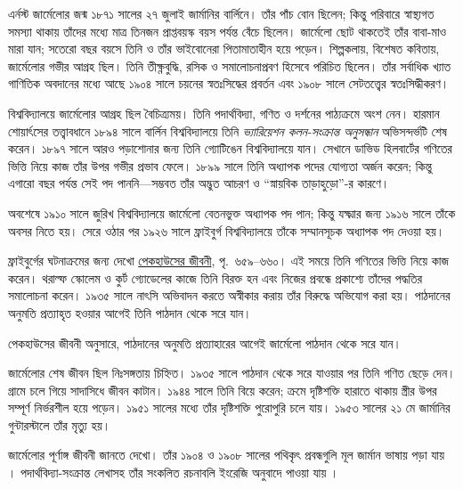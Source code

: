 \documentclass[../../../include/open-logic-section]{subfiles}
\begin{document}



এর্নস্ট জার্মেলোর জন্ম ১৮৭১ সালের ২৭ জুলাই
জার্মানির বার্লিনে। তাঁর পাঁচ বোন ছিলেন;
কিন্তু পরিবারে স্বাস্থ্যগত সমস্যা থাকায়
তাঁদের মধ্যে মাত্র তিনজন প্রাপ্তবয়স্ক
বয়স পর্যন্ত বেঁচে ছিলেন। জার্মেলো ছোট
থাকতেই তাঁর বাবা-মাও মারা যান; সতেরো
বছর বয়সে তিনি ও তাঁর ভাইবোনেরা
পিতামাতাহীন হয়ে পড়েন। শিল্পকলায়,
বিশেষত কবিতায়, জার্মেলোর গভীর আগ্রহ
ছিল। তিনি তীক্ষ্ণবুদ্ধি, রসিক ও
সমালোচনাপ্রবণ হিসেবে পরিচিত ছিলেন।
তাঁর সর্বাধিক খ্যাত গাণিতিক অবদানের
মধ্যে আছে ১৯০৪ সালে চয়নের
স্বতঃসিদ্ধের প্রবর্তন এবং ১৯০৮ সালে
সেটতত্ত্বের স্বতঃসিদ্ধীকরণ।

বিশ্ববিদ্যালয়ে জার্মেলোর আগ্রহ ছিল
বৈচিত্র্যময়। তিনি পদার্থবিদ্যা, গণিত
ও দর্শনের পাঠ্যক্রমে অংশ নেন।
হারমান শোয়ার্ৎসের তত্ত্বাবধানে
১৮৯৪ সালে বার্লিন বিশ্ববিদ্যালয়ে
তিনি \emph{ভ্যারিয়েশন কলন-সংক্রান্ত
অনুসন্ধান} অভিসন্দর্ভটি শেষ করেন।
১৮৯৭ সালে আরও পড়াশোনার জন্য
তিনি গ্যোটিঙেন বিশ্ববিদ্যালয়ে
যান। সেখানে ডাভিড হিলবার্টের
গণিতের ভিত্তি নিয়ে কাজ তাঁর
উপর গভীর প্রভাব ফেলে। ১৮৯৯
সালে তিনি অধ্যাপক পদের যোগ্যতা
অর্জন করেন; কিন্তু এগারো বছর
পর্যন্ত সেই পদ পাননি—সম্ভবত
তাঁর অদ্ভুত আচরণ ও “স্নায়বিক
তাড়াহুড়ো”-র কারণে।

অবশেষে ১৯১০ সালে জুরিখ
বিশ্ববিদ্যালয়ে জার্মেলো বেতনভুক্ত
অধ্যাপক পদ পান; কিন্তু যক্ষ্মার
জন্য ১৯১৬ সালে তাঁকে অবসর
নিতে হয়। সেরে ওঠার পর
১৯২৬ সালে ফ্রাইবুর্গ
বিশ্ববিদ্যালয়ে তাঁকে সম্মানসূচক
অধ্যাপক পদ দেওয়া হয়।

\par\smallskip\noindent ফ্রাইবুর্গের ঘটনাক্রমের জন্য দেখো \href{https://www.deutsche-biographie.de/sfz143025.html}{পেকহাউসের জীবনী}, পৃ.~৬৫৯--৬৬০।
 এই
সময়ে তিনি গণিতের ভিত্তি
নিয়ে কাজ করেন। থরাল্ফ
স্কোলেম ও কুর্ট গ্যোডেলের
কাজে তিনি বিরক্ত হন এবং
নিজের প্রবন্ধে প্রকাশ্যে তাঁদের
পদ্ধতির সমালোচনা করেন।
১৯৩৫ সালে নাৎসি অভিবাদন করতে
অস্বীকার করায় তাঁর বিরুদ্ধে অভিযোগ করা হয়।
পাঠদানের অনুমতি প্রত্যাহৃত হওয়ার আগেই
তিনি পাঠদান থেকে সরে যান।

\par\smallskip\noindent পেকহাউসের জীবনী অনুসারে, পাঠদানের অনুমতি প্রত্যাহারের আগেই জার্মেলো পাঠদান থেকে সরে যান।

জার্মেলোর শেষ জীবন ছিল
নিঃসঙ্গতায় চিহ্নিত। ১৯৩৫ সালে
পাঠদান থেকে সরে যাওয়ার পর তিনি গণিত
ছেড়ে দেন। গ্রামে চলে গিয়ে
সাদাসিধে জীবন কাটান। ১৯৪৪
সালে তিনি বিয়ে করেন; ক্রমে
দৃষ্টিশক্তি হারাতে থাকায় স্ত্রীর
উপর সম্পূর্ণ নির্ভরশীল হয়ে
পড়েন। ১৯৫১ সালের মধ্যে
তাঁর দৃষ্টিশক্তি পুরোপুরি চলে
যায়। ১৯৫৩ সালের ২১ মে
জার্মানির গুন্টারস্টালে তাঁর
মৃত্যু হয়।

\begin{reading}
জার্মেলোর পূর্ণাঙ্গ জীবনী
জানতে \citet{Ebbinghaus2015}
দেখো। তাঁর ১৯০৪ ও ১৯০৮
সালের পথিকৃৎ প্রবন্ধগুলি
মূল জার্মান ভাষায় পড়া যায়
\citep{Zermelo1904,Zermelo1908}।
পদার্থবিদ্যা-সংক্রান্ত লেখাসহ
তাঁর সংকলিত রচনাবলি ইংরেজি
অনুবাদে পাওয়া যায়
\citep{Ebbinghaus2010,Ebbinghaus2013}।
\end{reading}
\end{document}
